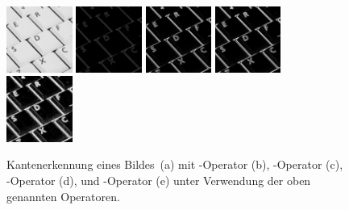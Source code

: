 \begin{figure}[H]
  \label{fig:edge-detection}
  \centering
  \includegraphics[width=0.1925\textwidth]{img/basics/edge-detection/original}
  \includegraphics[width=0.1925\textwidth]{img/basics/edge-detection/roberts}
  \includegraphics[width=0.1925\textwidth]{img/basics/edge-detection/prewitt}
  \includegraphics[width=0.1925\textwidth]{img/basics/edge-detection/sobel}
  \includegraphics[width=0.1925\textwidth]{img/basics/edge-detection/scharr}
  \caption[Kantenerkennung]{Kantenerkennung eines Bildes\protect\footnotemark~(a) mit -Operator (b), -Operator (c), -Operator (d), und -Operator (e) unter Verwendung der oben genannten Operatoren.}
\end{figure}

